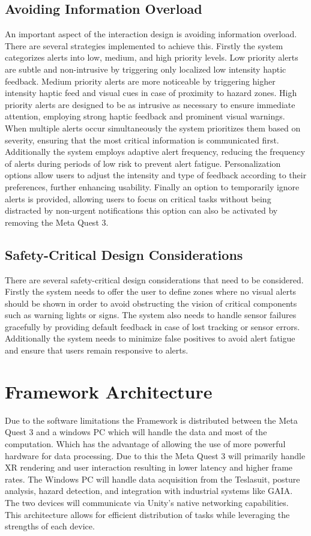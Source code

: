 \subsection{Avoiding Information Overload}
An important aspect of the interaction design is avoiding information overload. There are several strategies implemented to achieve this. Firstly the system categorizes alerts into low, medium, and high priority levels. Low priority alerts are subtle and non-intrusive by triggering only localized low intensity haptic feedback. Medium priority alerts are more noticeable by triggering higher intensity haptic feed and visual cues in case of proximity to hazard zones. High priority alerts are designed to be as intrusive as necessary to ensure immediate attention, employing strong haptic feedback and prominent visual warnings. When multiple alerts occur simultaneously the system prioritizes them based on severity, ensuring that the most critical information is communicated first.
 Additionally the system employs adaptive alert frequency, reducing the frequency of alerts during periods of low risk to prevent alert fatigue. Personalization options allow users to adjust the intensity and type of feedback according to their preferences, further enhancing usability. Finally an option to temporarily ignore alerts is provided, allowing users to focus on critical tasks without being distracted by non-urgent notifications this option can also be activated by removing the Meta Quest 3. 

\subsection{Safety-Critical Design Considerations}
There are several safety-critical design considerations that need to be considered. Firstly the system needs to offer the user to define zones where no visual alerts should be shown in order to avoid obstructing the vision of critical components such as warning lights or signs. The system also needs to handle sensor failures gracefully by providing default feedback in case of lost tracking or sensor errors. Additionally the system needs to minimize false positives to avoid alert fatigue and ensure that users remain responsive to alerts.

\section{Framework Architecture}
Due to the software limitations the Framework is distributed between the Meta Quest 3 and a windows PC which will handle the data and most of the computation. Which has the advantage of allowing the use of more powerful hardware for data processing. Due to this the Meta Quest 3 will primarily handle XR rendering and user interaction resulting in lower latency and higher frame rates. The Windows PC will handle data acquisition from the Teslasuit, posture analysis, hazard detection, and integration with industrial systems like GAIA. The two devices will communicate via Unity's native networking capabilities. This architecture allows for efficient distribution of tasks while leveraging the strengths of each device.

